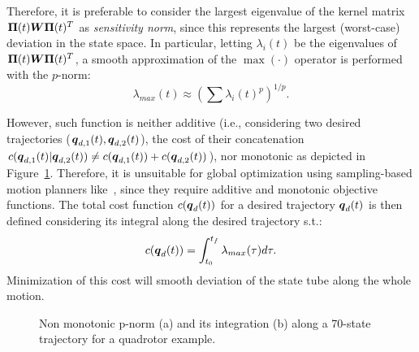 Therefore, it is preferable to consider the largest eigenvalue of the kernel matrix $\boldsymbol{\Pi}(t) \boldsymbol{W} \boldsymbol{\Pi}(t)^T$ as \emph{sensitivity norm}, since this represents the largest (worst-case) deviation in the state space. 
In particular, letting $\lambda_i(t)$ be the eigenvalues of $\boldsymbol{\Pi}(t) \boldsymbol{W} \boldsymbol{\Pi}(t)^T$, a smooth approximation of the $\max(\cdot)$ operator is performed with the $p$-norm:
\begin{equation}
    \lambda_{max}(t)\approx \left(\sum \lambda_{i}(t)^p\right)^{1/p}.
\end{equation} 

However, such function is neither additive (i.e., considering two desired trajectories ($\boldsymbol{q}_{d,1}(t), \boldsymbol{q}_{d,2}(t)$), the cost of their concatenation $c(\boldsymbol{q}_{d,1}(t)|\boldsymbol{q}_{d,2}(t)) \neq c(\boldsymbol{q}_{d,1}(t)) + c(\boldsymbol{q}_{d,2}(t))$), nor monotonic as depicted in Figure~\ref{fig:monotonic}.
Therefore, it is unsuitable for global optimization using sampling-based motion planners like~\cite{cRRTstar, cSST}, since they require additive and monotonic objective functions.
The total cost function $c(\boldsymbol{q}_d(t))$ for a desired trajectory $\boldsymbol{q}_d(t)$ is then defined considering its integral along the desired trajectory s.t.:
\begin{equation} \label{eq:cost_function}
    c(\boldsymbol{q}_d(t))=\int_{t_{0}}^{t_{f}}\lambda_{max}(\tau)d\tau.
\end{equation}
Minimization of this cost will smooth deviation of the state tube along the whole motion.

\begin{figure} [htp]
    \centering
    \caption{Non monotonic p-norm (a) and its integration (b) along a 70-state trajectory for a quadrotor example.}%
    \label{fig:monotonic}%
\end{figure}

